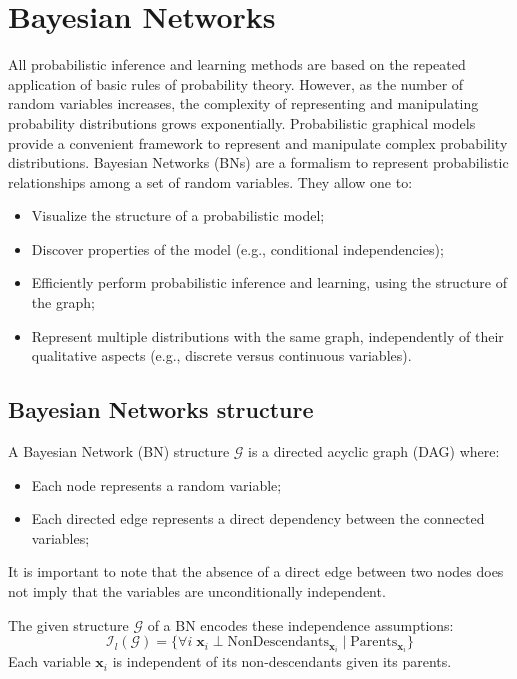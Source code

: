 \section{Bayesian Networks}
All probabilistic inference and learning methods are based on the repeated application of basic rules of probability theory.
However, as the number of random variables increases, the complexity of representing and manipulating probability distributions grows exponentially.
Probabilistic graphical models provide a convenient framework to represent and manipulate complex probability distributions. Bayesian Networks (BNs) are a formalism to represent probabilistic relationships among a set of random variables. They allow one to:
\begin{itemize}
    \item Visualize the structure of a probabilistic model;
    \item Discover properties of the model (e.g., conditional independencies);
    \item Efficiently perform probabilistic inference and learning, using the structure of the graph;
    \item Represent multiple distributions with the same graph, independently of their qualitative aspects
    (e.g., discrete versus continuous variables).
\end{itemize}

\subsection{Bayesian Networks structure}
A Bayesian Network (BN) structure $\mathcal{G}$ is a directed acyclic graph (DAG) where:
\begin{itemize}
    \item Each node represents a random variable;
    \item Each directed edge represents a direct dependency between the connected variables;
\end{itemize}
It is important to note that the absence of a direct edge between two nodes does not imply that the variables are unconditionally independent.

The given structure $\mathcal{G}$ of a BN encodes these independence assumptions:
\begin{equation}
    \label{eq:localIndependencies}
    \mathcal{I}_l(\mathcal{G}) = \{ \forall i\; \boldsymbol{x}_i \perp \text{NonDescendants}_{\boldsymbol{x}_i} \mid \text{Parents}_{\boldsymbol{x}_i} \}
\end{equation}
Each variable $\boldsymbol{x}_i$ is independent of its non-descendants given its parents. 

